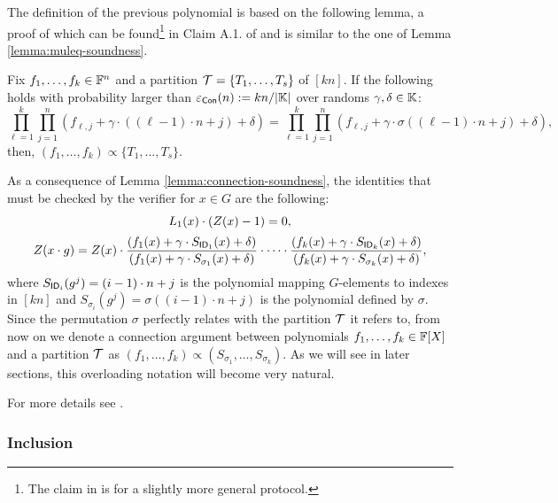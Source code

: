 The definition of the previous polynomial is based on the following lemma, a proof of which can be found\footnote{The claim in \cite{EPRINT:GabWilCio19} is for a slightly more general protocol.} in Claim A.1. of \cite{EPRINT:GabWilCio19} and is similar to the one of Lemma \ref{lemma:muleq-soundness}.
\begin{lemma}\label{lemma:connection-soundness}
Fix $f_1,\dots,f_k \in \mathbb{F}^n$ and a partition $\mathcal{T} = \{T_1,\dots,T_s\}$ of $[kn]$. If the following holds with probability larger than $\varepsilon_{\textsf{Con}}(n) := kn/|\mathbb{K}|$ over randoms $\gamma, \delta \in \mathbb{K}$:
\[
\prod_{\ell=1}^k \prod_{j=1}^n (f_{\ell,j} + \gamma \cdot ((\ell-1)\cdot n + j) + \delta) = \prod_{\ell=1}^k \prod_{j=1}^n (f_{\ell,j} + \gamma \cdot \sigma((\ell-1)\cdot n + j) + \delta),
\]
then, $(f_1,\dots,f_k) \propto \{T_1,\dots,T_s\}$.
\end{lemma}

As a consequence of Lemma \ref{lemma:connection-soundness}, the identities that must be checked by the verifier for $x \in G$ are the following: 
\begin{align} \label{eq:connection-Z}
\begin{array}{c}
  L_1(x) \cdot (Z(x) - 1) = 0, \\[0.2cm]
  \displaystyle Z(x \cdot g)  = Z(x) \cdot \frac{(f_{1}(x) + \gamma \cdot S_{\textsf{ID}_1}(x) + \delta)}{(f_{1}(x) + \gamma \cdot S_{\sigma_1}(x) + \delta)} \cdot \cdots \cdot \frac{(f_{k}(x) + \gamma \cdot S_{\textsf{ID}_k}(x) + \delta)}{(f_{k}(x) + \gamma \cdot S_{\sigma_k}(x) + \delta)},
\end{array}
\end{align}
where $S_{\textsf{ID}_{i}}(g^j) = (i-1)\cdot n +j$ is the polynomial mapping $G$-elements to indexes in $[kn]$ and $S_{\sigma_{i}}(g^j) = \sigma((i-1)\cdot n +j)$ is the polynomial defined by $\sigma$. Since the permutation $\sigma$ perfectly relates with the partition $\mathcal{T}$ it refers to, from now on we denote a connection argument between polynomials $f_1,\dots,f_k \in \mathbb{F}[X]$ and a partition $\mathcal{T}$ as $(f_1,\dots,f_k) \propto (S_{\sigma_1},\dots,S_{\sigma_k})$. As we will see in later sections, this overloading notation will become very natural.

For more details see \cite{EPRINT:GabWilCio19}.


\subsubsection*{Inclusion}

